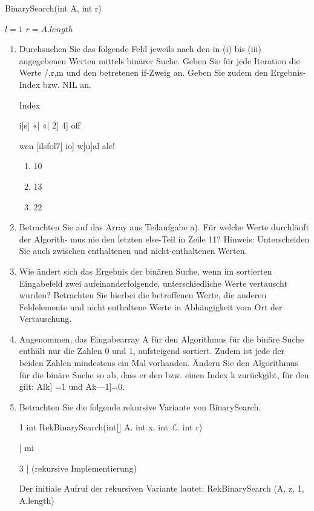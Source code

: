 \documentclass{bschlangaul-aufgabe}
\begin{document}
\begin{function}
\caption{BinarySearch(int A, int r)}
$l=1$\;
$r= A.length$\;
\end{function}
\begin{enumerate}


\item Durchsuchen Sie das folgende Feld jeweils nach den in (i) bis
(iii) angegebenen Werten mittels binärer Suche. Geben Sie für jede
Iteration die Werte /,r,m und den betretenen if-Zweig an. Geben Sie
zudem den Ergebnis-Index bzw. NIL an.

Index

i]s] «| «| 2] 4] off

wen [ilsfol7] io] w]u]al ale!
\begin{enumerate}

\item 10

\item 13

\item 22
\end{enumerate}


\item Betrachten Sie auf das Array aus Teilaufgabe a). Für welche Werte
durchläuft der Algorith- mus nie den letzten else-Teil in Zeile 11?
Hinweis: Unterscheiden Sie auch zwischen enthaltenen und
nicht-enthaltenen Werten.


\item Wie ändert sich das Ergebnis der binären Suche, wenn im sortierten
Eingabefeld zwei aufeinanderfolgende, unterschiedliche Werte
vertauscht wurden? Betrachten Sie hierbei die betroffenen Werte, die
anderen Feldelemente und nicht enthaltene Werte in Abhängigkeit vom Ort
der Vertauschung.


\item Angenommen, das Eingabearray A für den Algorithmus für die binäre
Suche enthält nur die Zahlen 0 und 1, aufsteigend sortiert. Zudem ist
jede der beiden Zahlen mindestens ein Mal vorhanden. Ändern Sie den
Algorithmus für die binäre Suche so ab, dass er den bzw. einen Index k
zurückgibt, für den gilt: Alk] =1 und Ak—1]=0.


\item Betrachten Sie die folgende rekursive Variante von BinarySearch.

1 int RekBinarySearch(int[] A. int x. int £. int r)

| mi

3 | (rekursive Implementierung)

Der initiale Aufruf der rekursiven Variante lautet:
RekBinarySearch (A, z, 1, A.length)
\end{enumerate}
\end{document}

